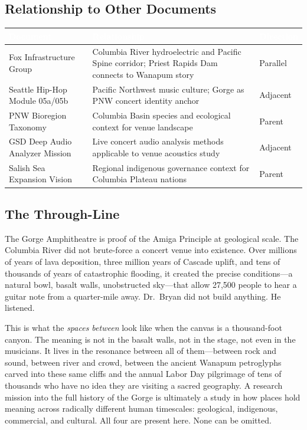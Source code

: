\documentclass[11pt,letterpaper]{article}
\newcommand{\tableheader}[1]{\textbf{\sffamily\textcolor{white}{#1}}}
\begin{document}
\subsection{Relationship to Other Documents}

\begin{center}
\begin{tabularx}{\textwidth}{L{3.5cm}XC{2.5cm}}
\toprule
{}
\tableheader{Document} & \tableheader{Relationship} & \tableheader{Direction} \\
\midrule
Fox Infrastructure Group & Columbia River hydroelectric and Pacific Spine corridor; Priest Rapids Dam connects to Wanapum story & Parallel \\
Seattle Hip-Hop Module 05a/05b & Pacific Northwest music culture; Gorge as PNW concert identity anchor & Adjacent \\
PNW Bioregion Taxonomy & Columbia Basin species and ecological context for venue landscape & Parent \\
GSD Deep Audio Analyzer Mission & Live concert audio analysis methods applicable to venue acoustics study & Adjacent \\
Salish Sea Expansion Vision & Regional indigenous governance context for Columbia Plateau nations & Parent \\
\bottomrule
\end{tabularx}
\end{center}

\subsection{The Through-Line}

The Gorge Amphitheatre is proof of the Amiga Principle at geological scale. The Columbia River did not brute-force a concert venue into existence. Over millions of years of lava deposition, three million years of Cascade uplift, and tens of thousands of years of catastrophic flooding, it created the precise conditions---a natural bowl, basalt walls, unobstructed sky---that allow 27,500 people to hear a guitar note from a quarter-mile away. Dr.\ Bryan did not build anything. He listened.

This is what the \textit{spaces between} look like when the canvas is a thousand-foot canyon. The meaning is not in the basalt walls, not in the stage, not even in the musicians. It lives in the resonance between all of them---between rock and sound, between river and crowd, between the ancient Wanapum petroglyphs carved into these same cliffs and the annual Labor Day pilgrimage of tens of thousands who have no idea they are visiting a sacred geography. A research mission into the full history of the Gorge is ultimately a study in how places hold meaning across radically different human timescales: geological, indigenous, commercial, and cultural. All four are present here. None can be omitted.
\end{document}
